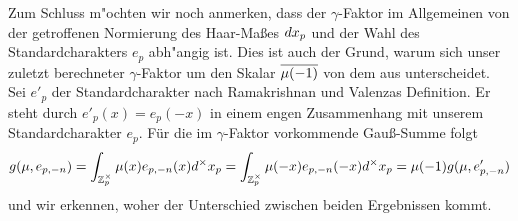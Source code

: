 	Zum Schluss m"ochten wir noch anmerken, dass der $\gamma$-Faktor im Allgemeinen von der getroffenen Normierung des Haar-Maßes $d{x}_p$ und der Wahl des Standardcharakters $e_p$  abh"angig ist.
	Dies ist auch der Grund, warum sich unser zuletzt berechneter $\gamma$-Faktor um den Skalar $\overline{\mu(-1)}$ von dem aus \textcite{rama} unterscheidet.
	Sei $e'_p$ der Standardcharakter nach Ramakrishnan und Valenzas Definition.
	Er steht durch $e'_p(x) = e_p(-x)$ in einem engen Zusammenhang mit unserem Standardcharakter $e_p$. 
	Für die im $\gamma$-Faktor vorkommende Gauß-Summe folgt
	\begin{align*}
		g(\mu,e_{p,-n}) = \int_{\mathbb{Z}_p^\times} \mu(x) e_{p,-n}(x) d^\times {x}_p =\int_{\mathbb{Z}_p^\times} \mu(-x) e_{p,-n}(-x) d^\times {x}_p =\mu(-1) g(\mu,e'_{p,-n})
	\end{align*}
	und wir erkennen, woher der Unterschied zwischen beiden Ergebnissen kommt.

	